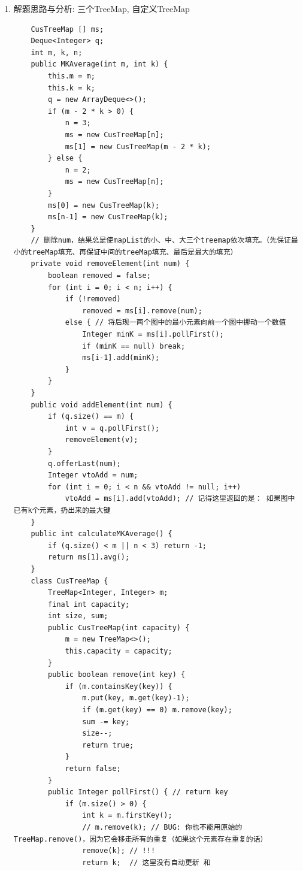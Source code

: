 \documentclass[9pt, b5paaper]{book}
\begin{document}
\begin{enumerate}
\item 解题思路与分析: 三个TreeMap, 自定义TreeMap
\label{sec-1-1-3-1}
\begin{verbatim}
    CusTreeMap [] ms;
    Deque<Integer> q;
    int m, k, n;
    public MKAverage(int m, int k) {
        this.m = m;
        this.k = k;
        q = new ArrayDeque<>();
        if (m - 2 * k > 0) {
            n = 3;
            ms = new CusTreeMap[n];
            ms[1] = new CusTreeMap(m - 2 * k);
        } else {
            n = 2;
            ms = new CusTreeMap[n];
        }
        ms[0] = new CusTreeMap(k);
        ms[n-1] = new CusTreeMap(k);
    }
    // 删除num，结果总是使mapList的小、中、大三个treemap依次填充。（先保证最小的treeMap填充、再保证中间的treeMap填充、最后是最大的填充）
    private void removeElement(int num) {
        boolean removed = false;
        for (int i = 0; i < n; i++) {
            if (!removed)
                removed = ms[i].remove(num);
            else { // 将后现一两个图中的最小元素向前一个图中挪动一个数值
                Integer minK = ms[i].pollFirst();
                if (minK == null) break;
                ms[i-1].add(minK);
            }
        }
    }
    public void addElement(int num) {
        if (q.size() == m) {
            int v = q.pollFirst();
            removeElement(v);
        }
        q.offerLast(num);
        Integer vtoAdd = num;
        for (int i = 0; i < n && vtoAdd != null; i++) 
            vtoAdd = ms[i].add(vtoAdd); // 记得这里返回的是： 如果图中已有k个元素，扔出来的最大键
    }
    public int calculateMKAverage() {
        if (q.size() < m || n < 3) return -1;
        return ms[1].avg();
    }
    class CusTreeMap {
        TreeMap<Integer, Integer> m;
        final int capacity;
        int size, sum;
        public CusTreeMap(int capacity) {
            m = new TreeMap<>();
            this.capacity = capacity;
        }
        public boolean remove(int key) {
            if (m.containsKey(key)) {
                m.put(key, m.get(key)-1);
                if (m.get(key) == 0) m.remove(key);
                sum -= key;
                size--;
                return true;
            }
            return false;
        }
        public Integer pollFirst() { // return key
            if (m.size() > 0) {
                int k = m.firstKey();
                // m.remove(k); // BUG: 你也不能用原始的TreeMap.remove()，因为它会移走所有的重复（如果这个元素存在重复的话）
                remove(k); // !!!
                return k;  // 这里没有自动更新 和 

\end{verbatim}
\end{enumerate}
\end{document}
